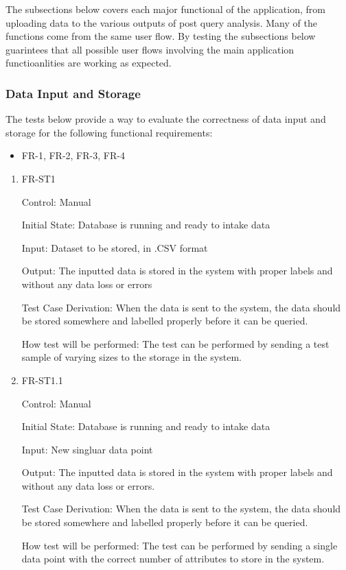 \documentclass[12pt, titlepage]{article}
\begin{document}
The subsections below covers each major functional of the application, from
uploading data to the various outputs of post query analysis. Many of the
functions come from the same user flow. By testing the subsections below
guarintees that all possible user flows involving the main application
functioanlities are working as expected. 

\subsubsection{Data Input and Storage}
The tests below provide a way to evaluate the correctness of data input and
storage for the following functional requirements:
\begin{itemize}
  \item FR-1, FR-2, FR-3, FR-4
\end{itemize}

\begin{enumerate}

\item{FR-ST1}

Control: Manual
					
Initial State: Database is running and ready to intake data
					
Input: Dataset to be stored, in .CSV format
					
Output: The inputted data is stored in the system with proper labels and without
any data loss or errors

Test Case Derivation: When the data is sent to the system, the data should be
stored somewhere and labelled properly before it can be queried.
					
How test will be performed: The test can be performed by sending a test sample
of varying sizes to the storage in the system.

\item {FR-ST1.1}

Control: Manual
					
Initial State: Database is running and ready to intake data
					
Input: New singluar data point 
					
Output: The inputted data is stored in the system with proper labels and without
any data loss or errors.

Test Case Derivation: When the data is sent to the system, the data should be
stored somewhere and labelled properly before it can be queried.
					
How test will be performed: The test can be performed by sending a single data
point with the correct number of attributes to store in
the system.

\end{enumerate}
\end{document}
